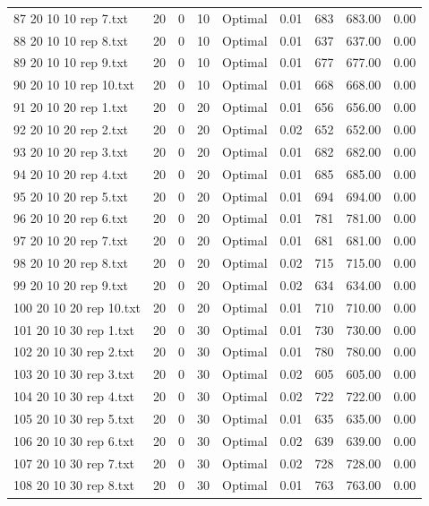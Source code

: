 \begin{longtable}{lrrllrrrr}
87 20 10 10 rep 7.txt & 20 & 0 & 10 & Optimal &  0.01 & 683 & 683.00 &  0.00\\
88 20 10 10 rep 8.txt & 20 & 0 & 10 & Optimal &  0.01 & 637 & 637.00 &  0.00\\
89 20 10 10 rep 9.txt & 20 & 0 & 10 & Optimal &  0.01 & 677 & 677.00 &  0.00\\
90 20 10 10 rep 10.txt & 20 & 0 & 10 & Optimal &  0.01 & 668 & 668.00 &  0.00\\
91 20 10 20 rep 1.txt & 20 & 0 & 20 & Optimal &  0.01 & 656 & 656.00 &  0.00\\
92 20 10 20 rep 2.txt & 20 & 0 & 20 & Optimal &  0.02 & 652 & 652.00 &  0.00\\
93 20 10 20 rep 3.txt & 20 & 0 & 20 & Optimal &  0.01 & 682 & 682.00 &  0.00\\
94 20 10 20 rep 4.txt & 20 & 0 & 20 & Optimal &  0.01 & 685 & 685.00 &  0.00\\
95 20 10 20 rep 5.txt & 20 & 0 & 20 & Optimal &  0.01 & 694 & 694.00 &  0.00\\
96 20 10 20 rep 6.txt & 20 & 0 & 20 & Optimal &  0.01 & 781 & 781.00 &  0.00\\
97 20 10 20 rep 7.txt & 20 & 0 & 20 & Optimal &  0.01 & 681 & 681.00 &  0.00\\
98 20 10 20 rep 8.txt & 20 & 0 & 20 & Optimal &  0.02 & 715 & 715.00 &  0.00\\
99 20 10 20 rep 9.txt & 20 & 0 & 20 & Optimal &  0.02 & 634 & 634.00 &  0.00\\
100 20 10 20 rep 10.txt & 20 & 0 & 20 & Optimal &  0.01 & 710 & 710.00 &  0.00\\
101 20 10 30 rep 1.txt & 20 & 0 & 30 & Optimal &  0.01 & 730 & 730.00 &  0.00\\
102 20 10 30 rep 2.txt & 20 & 0 & 30 & Optimal &  0.01 & 780 & 780.00 &  0.00\\
103 20 10 30 rep 3.txt & 20 & 0 & 30 & Optimal &  0.02 & 605 & 605.00 &  0.00\\
104 20 10 30 rep 4.txt & 20 & 0 & 30 & Optimal &  0.02 & 722 & 722.00 &  0.00\\
105 20 10 30 rep 5.txt & 20 & 0 & 30 & Optimal &  0.01 & 635 & 635.00 &  0.00\\
106 20 10 30 rep 6.txt & 20 & 0 & 30 & Optimal &  0.02 & 639 & 639.00 &  0.00\\
107 20 10 30 rep 7.txt & 20 & 0 & 30 & Optimal &  0.02 & 728 & 728.00 &  0.00\\
108 20 10 30 rep 8.txt & 20 & 0 & 30 & Optimal &  0.01 & 763 & 763.00 &  0.00\\

\end{longtable}
